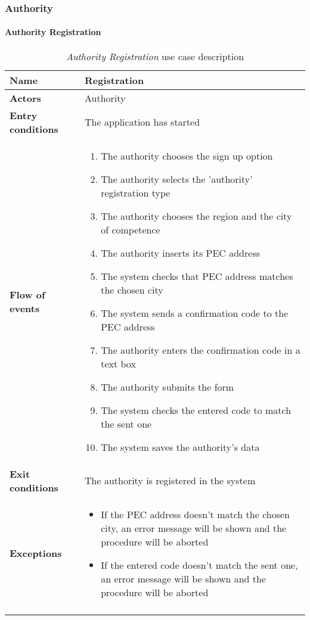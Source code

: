 	\subsubsection{Authority}
		\paragraph{Authority Registration}
			\begin{longtable}{p{0.25\linewidth}p{0.75\linewidth}}
				\toprule
				\textbf{Name} & \textbf{Registration} \\
				\midrule
				\textbf{Actors} & Authority \\
				\midrule
				\textbf{Entry conditions} & The application has started \\
				\midrule
				\textbf{Flow of events} & 
				\begin{enumerate}
					\item The authority chooses the sign up option
					\item The authority selects the 'authority' registration type
					\item The authority chooses the region and the city of competence
					\item The authority inserts its PEC address
					\item The system checks that PEC address matches the chosen city
					\item The system sends a confirmation code to the PEC address
					\item The authority enters the confirmation code in a text box
					\item The authority submits the form
					\item The system checks the entered code to match the sent one
					\item The system saves the authority's data
				\end{enumerate} \\
				\midrule
				\textbf{Exit conditions} & The authority is registered in the system\\
				\midrule
				\textbf{Exceptions} & 
				\begin{itemize}
					\item If the PEC address doesn't match the chosen city, an error message will be shown and the procedure will be aborted
					\item If the entered code doesn't match the sent one, an error message will be shown and the procedure will be aborted
				\end{itemize} \\
				\bottomrule
				\caption{\emph{Authority Registration} use case description}
			\end{longtable}
		
